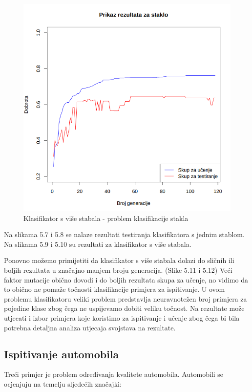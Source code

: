 \documentclass[times, utf8, zavrsni]{fer}
\begin{document}
\begin{figure}[htb]
\centering
\includegraphics[scale=0.45]{grafovi/staklo2-3}
\caption{Klasifikator s više stabala - problem klasifikacije stakla}
\end{figure}

Na slikama 5.7 i 5.8 se nalaze rezultati testiranja klasifikatora s jednim stablom. Na slikama 5.9 i 5.10 su rezultati za klasifikator s više stabala.

Ponovno možemo primijetiti da klasifikator s više stabala dolazi do sličnih ili boljih rezultata u značajno manjem broju generacija. (Slike 5.11 i 5.12) Veći faktor mutacije obično dovodi i do boljih rezultata skupa za učenje, no vidimo da to obično ne pomaže točnosti klasifikacije primjera za ispitivanje. U ovom problemu klasifikatoru veliki problem predstavlja neuravnotežen broj primjera za pojedine klase zbog čega ne uspijevamo dobiti veliku točnost. Na rezultate može utjecati i izbor primjera koje koristimo za ispitivanje i učenje zbog čega bi bila potrebna detaljna analiza utjecaja svojstava na rezultate.


\subsection{Ispitivanje automobila}

Treći primjer je problem određivanja kvalitete automobila. Automobili se ocjenjuju na temelju sljedećih značajki:
\end{document}
